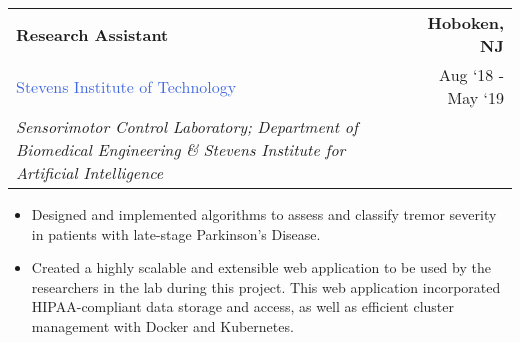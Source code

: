 \documentclass[10pt]{article}
\newcommand{\highlightcolor}{RoyalBlue}
\newcommand{\tabularxwidth}{\textwidth}
\begin{document}
    \begin{minipage}{\tabularxwidth}

        \begin{tabularx}{\tabularxwidth}{X r}
            \textbf{Research Assistant} & \textbf{Hoboken, 
        NJ} \\
            
    
    
    
    

    
        \textcolor{\highlightcolor}{Stevens Institute of Technology} & 
        
    Aug ‘18 - 
    May ‘19 \\
        
            \textit{Sensorimotor Control Laboratory;}
                \textit{Department of Biomedical Engineering} \textit{\&}
                \textit{Stevens Institute for Artificial Intelligence} & \\
        
    
            
        \end{tabularx}

        \begin{itemize}[noitemsep, topsep=3pt, parsep=0pt, partopsep=0pt]
            
                \item 
    Designed and implemented algorithms to assess and classify tremor severity in patients with late-stage Parkinson's Disease.
            
                \item 
    Created a highly scalable and extensible web application to be used by the researchers in the lab during this project. This web application incorporated HIPAA-compliant data storage and access, as well as efficient cluster management with Docker and Kubernetes.
            
        \end{itemize}

        
            \vspace{.3em}
        

    \end{minipage}
    
\end{document}
